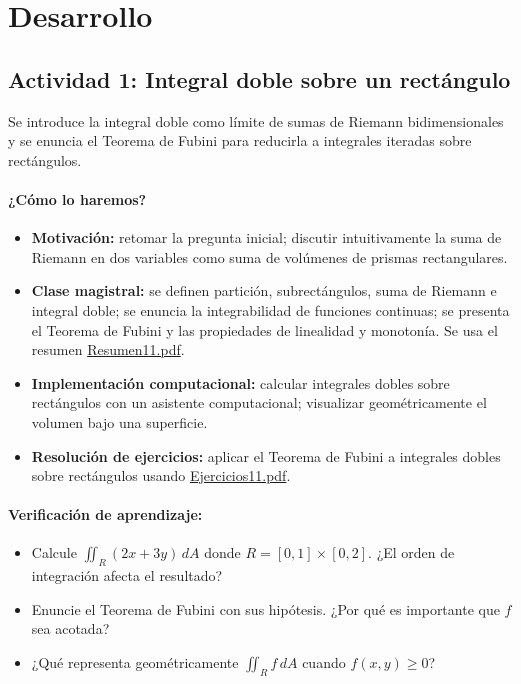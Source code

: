 \documentclass[a4,11pt]{aleph-notas}
\begin{document}
\section*{Desarrollo}

\subsection*{Actividad 1: Integral doble sobre un rectángulo}
Se introduce la integral doble como límite de sumas de Riemann bidimensionales y se enuncia el Teorema de Fubini para reducirla a integrales iteradas sobre rectángulos.

\paragraph{¿Cómo lo haremos?}
\begin{itemize}[leftmargin=*]
    \item \textbf{Motivación:} retomar la pregunta inicial; discutir intuitivamente la suma de Riemann en dos variables como suma de volúmenes de prismas rectangulares.
    \item \textbf{Clase magistral:} se definen partición, subrectángulos, suma de Riemann e integral doble; se enuncia la integrabilidad de funciones continuas; se presenta el Teorema de Fubini y las propiedades de linealidad y monotonía. Se usa el resumen \href{https://andres-merino.github.io/MatematicaIII-05-N0051/01Resumen/Resumen11.pdf}{Resumen11.pdf}.
    \item \textbf{Implementación computacional:} calcular integrales dobles sobre rectángulos con un asistente computacional; visualizar geométricamente el volumen bajo una superficie.
    \item \textbf{Resolución de ejercicios:} aplicar el Teorema de Fubini a integrales dobles sobre rectángulos usando \href{https://andres-merino.github.io/MatematicaIII-05-N0051/04Ejercicios/Ejercicios11.pdf}{Ejercicios11.pdf}.
\end{itemize}

\paragraph{Verificación de aprendizaje:}
\begin{itemize}[leftmargin=*]
    \item Calcule $\displaystyle\iint_R (2x+3y)\,dA$ donde $R=[0,1]\times[0,2]$. ¿El orden de integración afecta el resultado?
    \item Enuncie el Teorema de Fubini con sus hipótesis. ¿Por qué es importante que $f$ sea acotada?
    \item ¿Qué representa geométricamente $\iint_R f\,dA$ cuando $f(x,y)\geq 0$?
\end{itemize}
\end{document}
